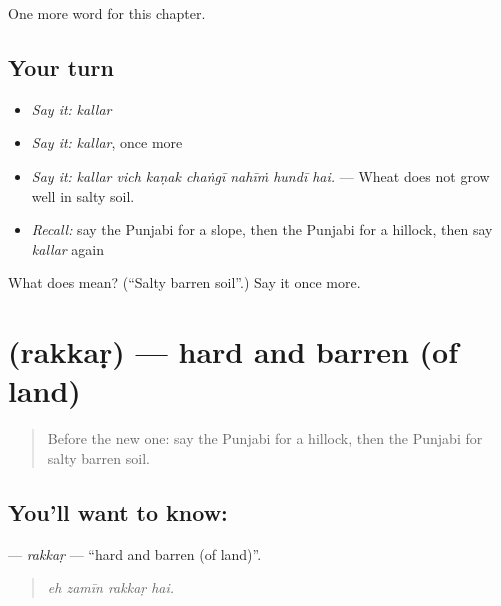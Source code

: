 \begin{grammarlens}[title={What you've built}]
One more word for this chapter.
\end{grammarlens}

\subsection*{Your turn}
\begin{itemize}
\raggedright
  \item \emph{Say it:} \emph{kallar}
  \item \emph{Say it:} \emph{kallar}, once more
  \item \emph{Say it:} \emph{kallar vich kaṇak chaṅgī nahīṁ hundī hai.} — Wheat does not grow well in salty soil.
  \item \emph{Recall:} say the Punjabi for a slope, then the Punjabi for a hillock, then say \emph{kallar} again
\end{itemize}

\begin{tcolorbox}[breakable,colback=teal!4,colframe=teal!35!black,title={Before you move on}]
What does  mean? (\textquotedblleft{}Salty barren soil\textquotedblright{}.) Say it once more.
\end{tcolorbox}
\section[\texorpdfstring{\pa{ਰੱਕੜ} (rakkaṛ)}{ਰੱਕੜ (rakkaṛ)}]{ (rakkaṛ) — hard and barren (of land)}

\label{lesson:PA-C294-rakkar}



\begin{quote}
Before the new one: say the Punjabi for a hillock, then the Punjabi for salty barren soil.
\end{quote}

\subsection*{You'll want to know: }
\textbf{} — \emph{rakkaṛ} — \textquotedblleft{}hard and barren (of land)\textquotedblright{}.

\begin{quote}
   
\end{quote}

\begin{quote}
\emph{eh zamīn rakkaṛ hai.}
\end{quote}

